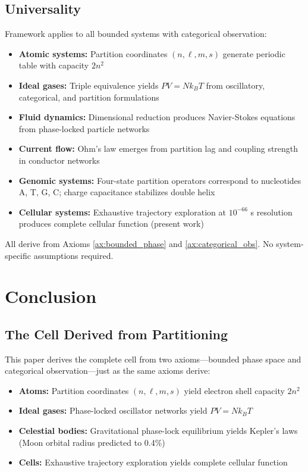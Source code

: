 \documentclass[11pt,a4paper]{article}
\theoremstyle{remark}
\begin{document}
\subsection{Universality}

Framework applies to all bounded systems with categorical observation:
\begin{itemize}
\item \textbf{Atomic systems:} Partition coordinates $(n,\ell,m,s)$ generate periodic table with capacity $2n^2$ \citep{Sachikonye2025_Partition}
\item \textbf{Ideal gases:} Triple equivalence yields $PV = Nk_BT$ from oscillatory, categorical, and partition formulations \citep{Sachikonye2025_IdealGas}
\item \textbf{Fluid dynamics:} Dimensional reduction produces Navier-Stokes equations from phase-locked particle networks \citep{Sachikonye2025_Fluid}
\item \textbf{Current flow:} Ohm's law emerges from partition lag and coupling strength in conductor networks \citep{Sachikonye2025_Current}
\item \textbf{Genomic systems:} Four-state partition operators correspond to nucleotides A, T, G, C; charge capacitance stabilizes double helix \citep{Sachikonye2025_Genome}
\item \textbf{Cellular systems:} Exhaustive trajectory exploration at $10^{-66}$ s resolution produces complete cellular function (present work)
\end{itemize}

All derive from Axioms \ref{ax:bounded_phase} and \ref{ax:categorical_obs}. No system-specific assumptions required.

\section{Conclusion}

\subsection{The Cell Derived from Partitioning}

This paper derives the complete cell from two axioms---bounded phase space and categorical observation---just as the same axioms derive:
\begin{itemize}
\item \textbf{Atoms:} Partition coordinates $(n,\ell,m,s)$ yield electron shell capacity $2n^2$
\item \textbf{Ideal gases:} Phase-locked oscillator networks yield $PV = Nk_BT$
\item \textbf{Celestial bodies:} Gravitational phase-lock equilibrium yields Kepler's laws (Moon orbital radius predicted to 0.4\%)
\item \textbf{Cells:} Exhaustive trajectory exploration yields complete cellular function
\end{itemize}
\end{document}
